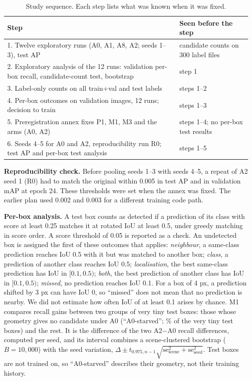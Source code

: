 \documentclass[11pt]{article}
\begin{document}
\begin{table}[t]\centering\caption{Study sequence. Each step lists what was known when it was fixed.}\label{tab:sequence}
\footnotesize\begin{tabular}{p{}p{}}\toprule
Step & Seen before the step \\\midrule
1. Twelve exploratory runs (A0, A1, A8, A2; seeds 1--3), test AP & candidate counts on 300 label files \\
2. Exploratory analysis of the 12 runs: validation per-box recall, candidate-count test, bootstrap & step 1 \\
3. Label-only counts on all train+val and test labels & steps 1--2 \\
4. Per-box outcomes on validation images, 12 runs; decision to train & steps 1--3 \\
5. Preregistration annex fixes P1, M1, M3 and the arms (A0, A2) & steps 1--4; no per-box test results \\
6. Seeds 4--5 for A0 and A2, reproducibility run R0; test AP and per-box test analysis & steps 1--5 \\\bottomrule
\end{tabular}\end{table}

\textbf{Reproducibility check.} Before pooling seeds 1--3 with seeds 4--5, a repeat of A2 seed 1 (R0) had to match the original
within 0.005 in test AP and in validation mAP at epoch 24. These thresholds were set when the annex was fixed. The earlier
plan used 0.002 and 0.003 for a different training code path.

\textbf{Per-box analysis.} A test box counts as detected if a prediction of its class with score at least 0.25 matches it at
rotated IoU at least 0.5, under greedy matching in score order. A score threshold of 0.05 is reported as a check. An undetected box
is assigned the first of these outcomes that applies: \emph{neighbour}, a same-class prediction reaches IoU 0.5 with it but was
matched to another box; \emph{class}, a prediction of another class reaches IoU 0.5; \emph{localisation}, the best same-class
prediction has IoU in $[0.1, 0.5)$; \emph{both}, the best prediction of another class has IoU in $[0.1, 0.5)$; \emph{missed},
no prediction reaches IoU 0.1. For a box of 4 px, a prediction shifted by 3 px can have IoU 0, so ``missed'' does not mean that
no prediction is nearby. We did not estimate how often IoU of at least 0.1 arises by chance. M1 compares recall gains between
two groups of very tiny test boxes: those whose geometry gives no candidate under A0 (``A0-starved''; \vtZeroCandTest\% of the
\nVtTest{} very tiny test boxes) and the rest. It is the difference of the two A2$-$A0 recall differences, computed per seed, and
its interval combines a scene-clustered bootstrap ($B=10{,}000$) with the seed variation,
$\Delta\pm t_{0.975,n-1}\sqrt{\mathrm{se}_\text{scene}^2+\mathrm{se}_\text{seed}^2}$. Test boxes are not trained on, so ``A0-starved''
describes their geometry, not their training history.
\end{document}
